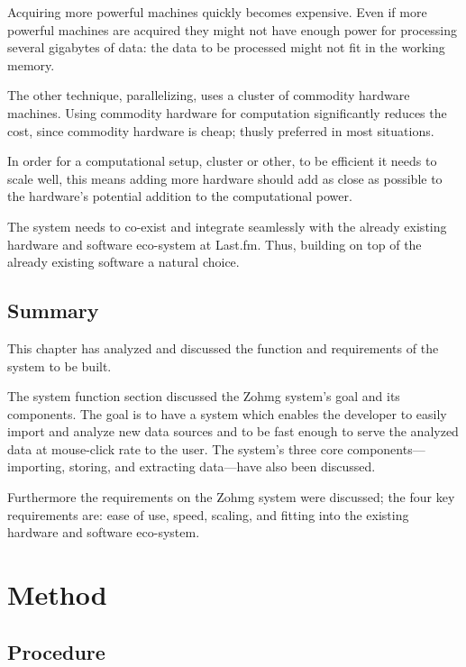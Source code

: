Acquiring more powerful machines quickly becomes expensive. Even if more
powerful machines are acquired they might not have enough power for processing
several gigabytes of data: the data to be processed might not fit in the working
memory.

The other technique, parallelizing, uses a cluster of commodity hardware
machines. Using commodity hardware for computation significantly reduces the
cost, since commodity hardware is cheap; thusly preferred in most situations.

In order for a computational setup, cluster or other, to be efficient it needs
to scale well, this means adding more hardware should add as close as possible
to the hardware's potential addition to the computational power.


The system needs to co-exist and integrate seamlessly with the already existing
hardware and software eco-system at Last.fm. Thus, building on top of the
already existing software a natural choice.


\section*{Summary}

This chapter has analyzed and discussed the function and requirements of the
system to be built.

The system function section discussed the Zohmg system's goal and its
components. The goal is to have a system which enables the developer to easily
import and analyze new data sources and to be fast enough to serve the analyzed
data at mouse-click rate to the user. The system's three core
components---importing, storing, and extracting data---have also been
discussed.

Furthermore the requirements on the Zohmg system were discussed; the four key
requirements are: ease of use, speed, scaling, and fitting into the existing
hardware and software eco-system.



\chapter{Method}



\section{Procedure}

